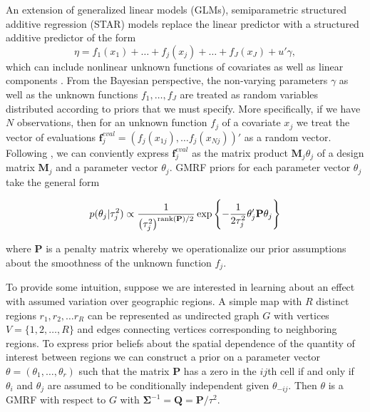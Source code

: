 An extension of generalized linear models (GLMs), semiparametric structured additive regression (STAR) models replace the linear predictor with a structured additive predictor of the form
%
\begin{equation*}
\eta = f_1(x_1) + \ldots + f_j(x_j) + \ldots + f_J(x_J) + u'\gamma,
\end{equation*}
%
\noindent which can include nonlinear unknown functions of covariates as well as linear components . From the Bayesian perspective, the non-varying parameters $\gamma$ as well as the unknown functions $f_1, \dots, f_J$ are treated as random variables distributed according to priors that we must specify. More specifically, if we have $N$ observations, then for an unknown function $f_j$ of a covariate $x_j$ we treat the vector of evaluations $\mathbf{f}_j^{eval} = \left(f_j(x_{1j}), \dots f_j(x_{Nj})\right)' $ as a random vector. Following , we can conviently express $\mathbf{f}_j^{eval}$ as the matrix product $\mathbf{M}_j \theta_j$ of a design matrix $\mathbf{M}_j$ and a parameter vector $\theta_j$. GMRF priors for each parameter vector $\theta_j$ take the general form

\begin{equation*}
p(\theta_j | \tau^2_j) 
\propto 
\frac{1}{\left(\tau^2_j\right)^{{\rm rank}(\mathbf{P})/2} }
\exp{\left\{-\frac{1}{2\tau^2_j} \theta_j' \mathbf{P} \theta_j\right\}}
\end{equation*}

\noindent where $\mathbf{P}$ is a penalty matrix whereby we operationalize our prior assumptions about the smoothness of the unknown function $f_j$. 

To provide some intuition, suppose we are interested in learning about an effect with assumed variation over geographic regions.  A simple map with $R$ distinct regions $r_1, r_2, \dots r_R$ can be represented as undirected graph $G$ with vertices $V = \{1, 2, \dots, R\}$ and edges connecting vertices corresponding to neighboring regions. To express prior beliefs about the spatial dependence of the quantity of interest between regions we can construct a prior on a parameter vector $\theta = (\theta_1, \dots, \theta_r)$ such that the matrix $\mathbf{P}$ has a zero in the $ij$th cell if and only if $\theta_i$ and $\theta_j$ are assumed to be conditionally independent given $\theta_{-ij}$. Then $\theta$ is a GMRF with respect to $G$ with $\boldsymbol{\Sigma}^{-1} = \mathbf{Q} = \mathbf{P}/\tau^2$. 

